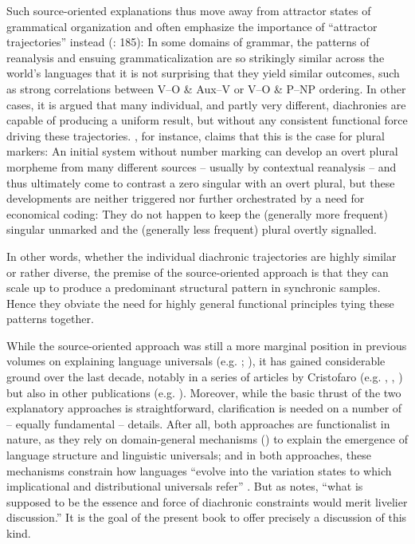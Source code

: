 \documentclass[output=paper]{langsci/langscibook}
\begin{document}
Such source-oriented explanations thus move away from attractor states of grammatical organization and often emphasize the importance of “attractor trajectories” instead (\citealt{BybeeBeckner2015}: 185): In some domains of grammar, the patterns of reanalysis and ensuing grammaticalization are so strikingly similar across the world’s languages that it is not surprising that they yield similar outcomes, such as strong correlations between V–O \& Aux–V or V–O \& P–NP ordering. In other cases, it is argued that many individual, and partly very different, diachronies are capable of producing a uniform result, but without any consistent functional force driving these trajectories. \citet{Cristofaro2017}, for instance, claims that this is the case for plural markers: An initial system without number marking can develop an overt plural morpheme from many different sources – usually by contextual reanalysis – and thus ultimately come to contrast a zero singular with an overt plural, but these developments are neither triggered nor further orchestrated by a need for economical coding: They do not happen to keep the (generally more frequent) singular unmarked and the (generally less frequent) plural overtly signalled. 

In other words, whether the individual diachronic trajectories are highly similar or rather diverse, the premise of the source-oriented approach is that they can scale up to produce a predominant structural pattern in synchronic samples. Hence they obviate the need for highly general functional principles tying these patterns together.

While the source-oriented approach was still a more marginal position in previous volumes on explaining language universals (e.g. \citealt{Hawkins1988_ExplEd}; \citealt{Good2008_Change}), it has gained considerable ground over the last decade, notably in a series of articles by Cristofaro (e.g. \citealt{Cristofaro2012}, \citealt{Cristofaro2014}, \citealt{Cristofaro2017}) but also in other publications (e.g. \citealt{Anderson2016,Creissels2008,GildeaZúñiga2016}). Moreover, while the basic thrust of the two explanatory approaches is straightforward, clarification is needed on a number of – equally fundamental – details. After all, both approaches are functionalist in nature, as they rely on domain-general mechanisms (\citealt{Bybee2010}) to explain the emergence of language structure and linguistic universals; and in both approaches, these mechanisms constrain how languages “evolve into the variation states to which implicational and distributional universals refer” \citep[18]{Hawkins1988_Intro}. But as \citet[51]{Plank2007} notes, “what is supposed to be the essence and force of diachronic constraints would merit livelier discussion.” It is the goal of the present book to offer precisely a discussion of this kind.
\end{document}
